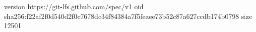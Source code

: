 version https://git-lfs.github.com/spec/v1
oid sha256:f22af2f0d540d2f0c7678dc34f84384a7f5feaee73b52c87a627ccdb174b0798
size 12501
